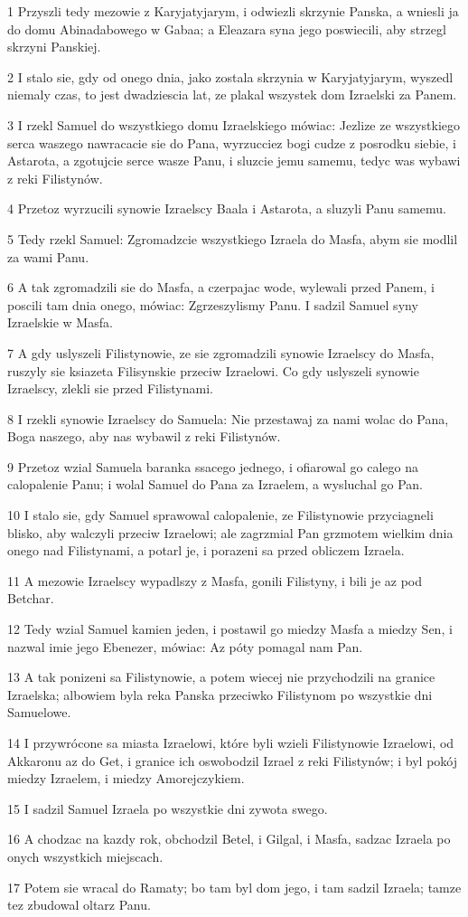\par 1 Przyszli tedy mezowie z Karyjatyjarym, i odwiezli skrzynie Panska, a wniesli ja do domu Abinadabowego w Gabaa; a Eleazara syna jego poswiecili, aby strzegl skrzyni Panskiej.
\par 2 I stalo sie, gdy od onego dnia, jako zostala skrzynia w Karyjatyjarym, wyszedl niemaly czas, to jest dwadziescia lat, ze plakal wszystek dom Izraelski za Panem.
\par 3 I rzekl Samuel do wszystkiego domu Izraelskiego mówiac: Jezlize ze wszystkiego serca waszego nawracacie sie do Pana, wyrzucciez bogi cudze z posrodku siebie, i Astarota, a zgotujcie serce wasze Panu, i sluzcie jemu samemu, tedyc was wybawi z reki Filistynów.
\par 4 Przetoz wyrzucili synowie Izraelscy Baala i Astarota, a sluzyli Panu samemu.
\par 5 Tedy rzekl Samuel: Zgromadzcie wszystkiego Izraela do Masfa, abym sie modlil za wami Panu.
\par 6 A tak zgromadzili sie do Masfa, a czerpajac wode, wylewali przed Panem, i poscili tam dnia onego, mówiac: Zgrzeszylismy Panu. I sadzil Samuel syny Izraelskie w Masfa.
\par 7 A gdy uslyszeli Filistynowie, ze sie zgromadzili synowie Izraelscy do Masfa, ruszyly sie ksiazeta Filisynskie przeciw Izraelowi. Co gdy uslyszeli synowie Izraelscy, zlekli sie przed Filistynami.
\par 8 I rzekli synowie Izraelscy do Samuela: Nie przestawaj za nami wolac do Pana, Boga naszego, aby nas wybawil z reki Filistynów.
\par 9 Przetoz wzial Samuela baranka ssacego jednego, i ofiarowal go calego na calopalenie Panu; i wolal Samuel do Pana za Izraelem, a wysluchal go Pan.
\par 10 I stalo sie, gdy Samuel sprawowal calopalenie, ze Filistynowie przyciagneli blisko, aby walczyli przeciw Izraelowi; ale zagrzmial Pan grzmotem wielkim dnia onego nad Filistynami, a potarl je, i porazeni sa przed obliczem Izraela.
\par 11 A mezowie Izraelscy wypadlszy z Masfa, gonili Filistyny, i bili je az pod Betchar.
\par 12 Tedy wzial Samuel kamien jeden, i postawil go miedzy Masfa a miedzy Sen, i nazwal imie jego Ebenezer, mówiac: Az póty pomagal nam Pan.
\par 13 A tak ponizeni sa Filistynowie, a potem wiecej nie przychodzili na granice Izraelska; albowiem byla reka Panska przeciwko Filistynom po wszystkie dni Samuelowe.
\par 14 I przywrócone sa miasta Izraelowi, które byli wzieli Filistynowie Izraelowi, od Akkaronu az do Get, i granice ich oswobodzil Izrael z reki Filistynów; i byl pokój miedzy Izraelem, i miedzy Amorejczykiem.
\par 15 I sadzil Samuel Izraela po wszystkie dni zywota swego.
\par 16 A chodzac na kazdy rok, obchodzil Betel, i Gilgal, i Masfa, sadzac Izraela po onych wszystkich miejscach.
\par 17 Potem sie wracal do Ramaty; bo tam byl dom jego, i tam sadzil Izraela; tamze tez zbudowal oltarz Panu.

